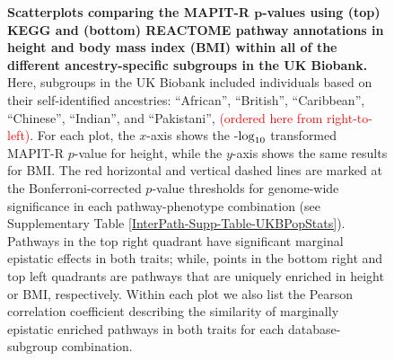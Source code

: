 \documentclass[10pt]{article}
\def\log{{\rm log}}
\begin{document}
\begin{landscape}
\begin{figure}[htbp]
\caption{\textbf{Scatterplots comparing the MAPIT-R $\bm{p}$-values using (top) KEGG and (bottom) REACTOME pathway annotations in height and body mass index (BMI) within all of the different ancestry-specific subgroups in the UK Biobank.} Here, subgroups in the UK Biobank included individuals based on their self-identified ancestries: ``African'', ``British'', ``Caribbean'', ``Chinese'', ``Indian'', and ``Pakistani'', \textcolor{red}{(ordered here from right-to-left)}. For each plot, the $x$-axis shows the -$\log_{10}$ transformed MAPIT-R $p$-value for height, while the $y$-axis shows the same results for BMI. The red horizontal and vertical dashed lines are marked at the Bonferroni-corrected $p$-value thresholds for genome-wide significance in each pathway-phenotype combination (see Supplementary Table \ref{InterPath-Supp-Table-UKBPopStats}). Pathways in the top right quadrant have significant marginal epistatic effects in both traits; while, points in the bottom right and top left quadrants are pathways that are uniquely enriched in height or BMI, respectively. Within each plot we also list the Pearson correlation coefficient describing the similarity of marginally epistatic enriched pathways in both traits for each database-subgroup combination.}
\label{InterPath-Supp-Figure-MAPITR-PhenoComps-AllPops}
\end{figure}
\clearpage
\setlength{\footskip}{1cm}
\end{landscape}

\end{document}

